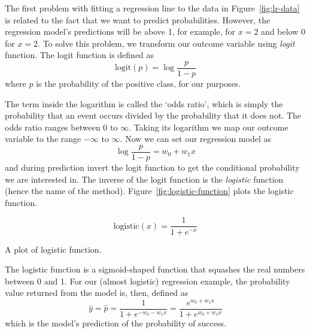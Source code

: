 The first problem with fitting a regression line
to the data in Figure~\ref{fig:lr-data} is related
to the fact that we want to predict probabilities.
However, the regression model's predictions will be 
above \num{1}, for example, for $x=2$
and below \num{0} for $x=2$.
To solve this problem,
we transform our outcome variable using \emph{logit}
function.
The logit function is defined as
\begin{equation*}
    \text{logit}(p) = \log\frac{p}{1-p}
\end{equation*}
where $p$ is the probability of the positive class,
for our purposes.

The term inside the logarithm is called the `odds ratio',
which is simply the probability that an event occurs
divided by the probability that it does not.
The odds ratio ranges between \num{0} to $\infty$.
Taking its logarithm we map our outcome variable to 
the range $-\infty$ to $\infty$.
Now we can set our regression model as
\begin{equation*}
    \log\frac{p}{1-p} = w_{0} + w_{1} x
\end{equation*}
and during prediction  invert the logit function
to get the conditional probability we are interested in. 
The inverse of the logit function is the \emph{logistic} function
(hence the name of the method).
Figure~\ref{fig:logistic-function} plots the logistic function.
\begin{marginfigure}
  \centering
  \[
    \text{logistic}(x) = \frac{1}{1 + e^{-x}}
  \]
  \caption{\label{fig:logistic-function}
    A plot of logistic function.
  }
\end{marginfigure}
The logistic function is a sigmoid-shaped function that
squashes the real numbers between \num{0} and \num{1}.
For our (almost logistic) regression example,
the probability value returned from the model is, then,
defined as
\begin{equation}\label{eq:logistic-regression}
  \hat{y} = \hat{p} = \frac{1}{1 + e^{-w_{0} - w_{1} x}}
          = \frac{e^{w_{0} + w_{1} x}}{1 + e^{w_{0} + w_{1} x}}
\end{equation}
which is the model's prediction of the probability of success.

